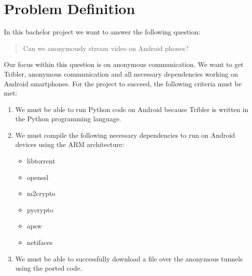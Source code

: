 \chapter{Problem Definition}

In this bachelor project we want to answer the following question:

\begin{quote}
Can we anonymously stream video on Android phones?
\end{quote}

Our focus within this question is on anonymous communication. We want to get Tribler, anonymous communication and all necessary dependencies working on Android smartphones. For the project to succeed, the following criteria must be met:
\begin{enumerate}
\item We must be able to run Python code on Android because Tribler is written in the Python programming language.
\item We must compile the following necessary dependencies to run on Android devices using the ARM architecture:
\begin{itemize}
\item libtorrent
\item openssl
\item m2crypto
\item pycrypto
\item apsw
\item netifaces
\end{itemize}
\item We must be able to successfully download a file over the anonymous tunnels using the ported code.
\end{enumerate}

